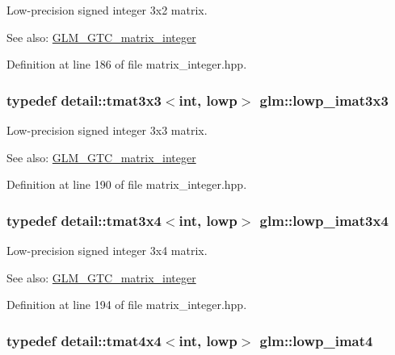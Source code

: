 Low-precision signed integer 3x2 matrix. \begin{Desc}
\item[See also:]\hyperlink{group__gtc__matrix__integer}{GLM\_\-GTC\_\-matrix\_\-integer} \end{Desc}


Definition at line 186 of file matrix\_\-integer.hpp.\hypertarget{group__gtc__matrix__integer_ge0d6068aaf9b1f8f06c6cc32941f9471}{
\subsubsection[lowp\_\-imat3x3]{\setlength{\rightskip}{0pt plus 5cm}typedef detail::tmat3x3$<$int, lowp$>$ {\bf glm::lowp\_\-imat3x3}}}
\label{group__gtc__matrix__integer_ge0d6068aaf9b1f8f06c6cc32941f9471}


Low-precision signed integer 3x3 matrix. \begin{Desc}
\item[See also:]\hyperlink{group__gtc__matrix__integer}{GLM\_\-GTC\_\-matrix\_\-integer} \end{Desc}


Definition at line 190 of file matrix\_\-integer.hpp.\hypertarget{group__gtc__matrix__integer_gba7c2c9f782278aaa10dad882d73ef0d}{
\subsubsection[lowp\_\-imat3x4]{\setlength{\rightskip}{0pt plus 5cm}typedef detail::tmat3x4$<$int, lowp$>$ {\bf glm::lowp\_\-imat3x4}}}
\label{group__gtc__matrix__integer_gba7c2c9f782278aaa10dad882d73ef0d}


Low-precision signed integer 3x4 matrix. \begin{Desc}
\item[See also:]\hyperlink{group__gtc__matrix__integer}{GLM\_\-GTC\_\-matrix\_\-integer} \end{Desc}


Definition at line 194 of file matrix\_\-integer.hpp.\hypertarget{group__gtc__matrix__integer_g7c687f14d923e05d5cf14aac41d10993}{
\subsubsection[lowp\_\-imat4]{\setlength{\rightskip}{0pt plus 5cm}typedef detail::tmat4x4$<$int, lowp$>$ {\bf glm::lowp\_\-imat4}}}
\label{group__gtc__matrix__integer_g7c687f14d923e05d5cf14aac41d10993}


